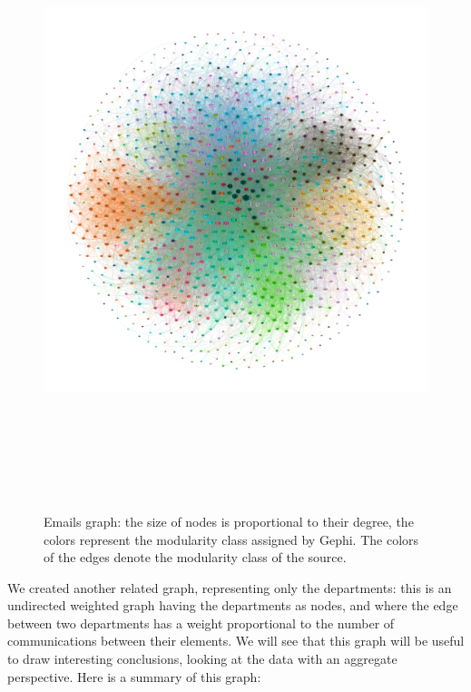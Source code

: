 \documentclass{report}
\theoremstyle{definition}
\theoremstyle{remark}
\begin{document}
\begin{figure} [H]
	\centering
	\centerline{\includegraphics[width = 24cm, height = 18cm, keepaspectratio]{eMail_graph.png}}
	\label{Email}
	\caption{Emails graph: the size of nodes is proportional to their degree, the colors represent the modularity class assigned by Gephi. The colors of the edges denote the modularity class of the source.}
\end{figure}

We created another related graph, representing only the departments: this is an undirected weighted graph having the departments as nodes,  and where the edge between two departments has a weight proportional to the number of communications between their elements. We will see that this graph will be useful to draw interesting conclusions, looking at the data with an aggregate perspective. Here is a summary of this graph:
\end{document}
